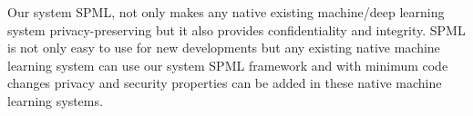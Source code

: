 Our system SPML, not only makes any native existing machine/deep learning system privacy-preserving but it also provides confidentiality and integrity. SPML is not only easy to use for new developments but any existing native machine learning system can use our system SPML framework and with minimum code changes privacy and security properties can be added in these native machine learning systems.
\clearpage